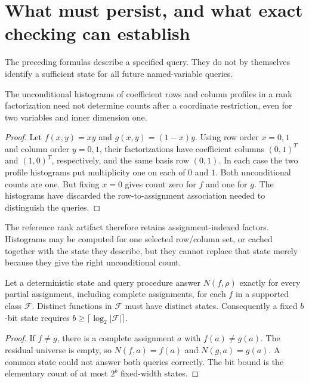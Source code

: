 \section{What must persist, and what exact checking can establish}
\label{sec:persistence}
The preceding formulas describe a specified query. They do not by themselves identify a sufficient state for all future named-variable queries.

\begin{proposition}
The unconditional histograms of coefficient rows and column profiles in a rank factorization need not determine counts after a coordinate restriction, even for two variables and inner dimension one.
\end{proposition}
\begin{proof}
Let $f(x,y)=xy$ and $g(x,y)=(1-x)y$. Using row order $x=0,1$ and column order $y=0,1$, their factorizations have coefficient columns $(0,1)^T$ and $(1,0)^T$, respectively, and the same basis row $(0,1)$. In each case the two profile histograms put multiplicity one on each of $0$ and $1$. Both unconditional counts are one. But fixing $x=0$ gives count zero for $f$ and one for $g$. The histograms have discarded the row-to-assignment association needed to distinguish the queries.
\end{proof}

The reference rank artifact therefore retains assignment-indexed factors. Histograms may be computed for one selected row/column set, or cached together with the state they describe, but they cannot replace that state merely because they give the right unconditional count.

\begin{proposition}
Let a deterministic state and query procedure answer $N(f,\rho)$ exactly for every partial assignment, including complete assignments, for each $f$ in a supported class $\mathcal F$. Distinct functions in $\mathcal F$ must have distinct states. Consequently a fixed $b$-bit state requires $b\ge\lceil\log_2|\mathcal F|\rceil$.
\end{proposition}
\begin{proof}
If $f\ne g$, there is a complete assignment $a$ with $f(a)\ne g(a)$. The residual universe is empty, so $N(f,a)=f(a)$ and $N(g,a)=g(a)$. A common state could not answer both queries correctly. The bit bound is the elementary count of at most $2^b$ fixed-width states.
\end{proof}

